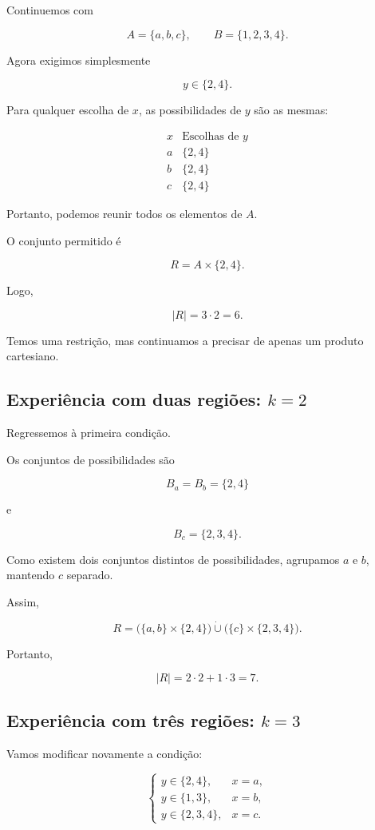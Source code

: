 \documentclass[11pt,a4paper,oneside]{book}
\newcommand{\card}[1]{\lvert #1\rvert}
\begin{document}
Continuemos com

\[
A=\{a,b,c\},\qquad B=\{1,2,3,4\}.
\]

Agora exigimos simplesmente

\[
y\in\{2,4\}.
\]

Para qualquer escolha de $x$,
as possibilidades de $y$ são as mesmas:

\[
\begin{array}{c|c}
x&\text{Escolhas de }y\\
\hline
a&\{2,4\}\\
b&\{2,4\}\\
c&\{2,4\}
\end{array}
\]

Portanto, podemos reunir todos
os elementos de $A$.

O conjunto permitido é

\[
R=A\times\{2,4\}.
\]

Logo,

\[
\boxed{\card R=3\cdot2=6}.
\]

Temos uma restrição, mas continuamos
a precisar de apenas um produto cartesiano.

\subsection*{Experiência com duas regiões: $k=2$}

Regressemos à primeira condição.

Os conjuntos de possibilidades são

\[
B_a=B_b=\{2,4\}
\]

e

\[
B_c=\{2,3,4\}.
\]

Como existem dois conjuntos
distintos de possibilidades,
agrupamos $a$ e $b$,
mantendo $c$ separado.

Assim,

\[
R=
\bigl(\{a,b\}\times\{2,4\}\bigr)
\mathbin{\dot\cup}
\bigl(\{c\}\times\{2,3,4\}\bigr).
\]

Portanto,

\[
\boxed{\card R=2\cdot2+1\cdot3=7}.
\]

\subsection*{Experiência com três regiões: $k=3$}

Vamos modificar novamente
a condição:

\[
\begin{cases}
y\in\{2,4\},&x=a,\\
y\in\{1,3\},&x=b,\\
y\in\{2,3,4\},&x=c.
\end{cases}
\]
\end{document}

